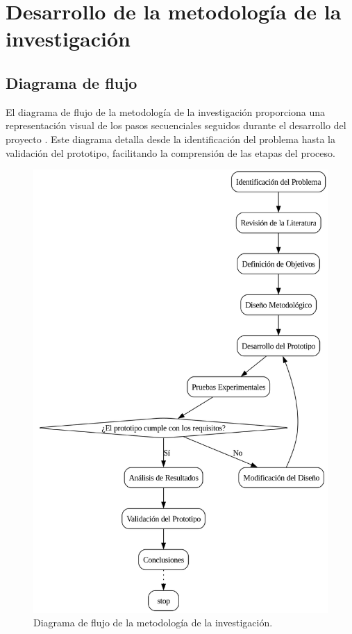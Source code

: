 \chapter{Desarrollo de la metodología de la investigación}
\section{Diagrama de flujo}
El diagrama de flujo de la metodología de la investigación proporciona una representación visual de los pasos secuenciales seguidos durante el desarrollo del proyecto \cite{Clark2026}. Este diagrama detalla desde la identificación del problema hasta la validación del prototipo, facilitando la comprensión de las etapas del proceso.
\begin{figure}[H]
    \centering
    \includegraphics[width=1\textwidth]{img/Metodologia.png}
    \caption{Diagrama de flujo de la metodología de la investigación.}
    \label{fig:flowchart}
\end{figure}


